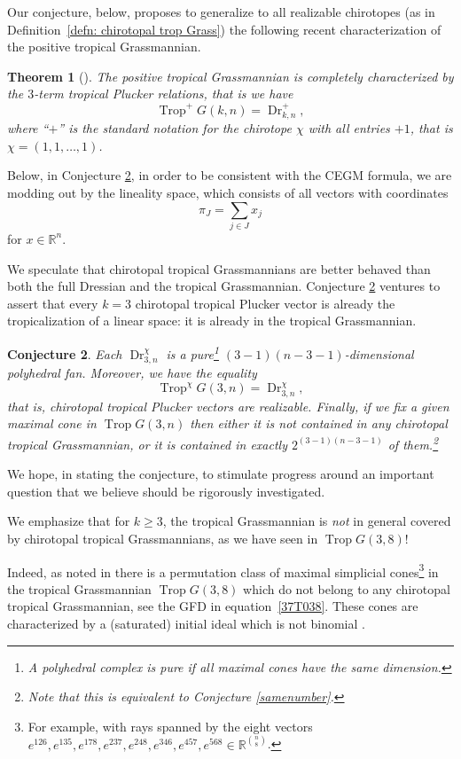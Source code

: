 \documentclass[pdftex]{sigma}
\newtheorem{thm}{Theorem}[section]
\newtheorem{conj}[thm]{Conjecture}
\theoremstyle{definition}
\numberwithin{equation}{section}
\begin{document}
Our conjecture, below, proposes to generalize to all realizable chirotopes (as in Definition~\ref{defn: chirotopal trop Grass}) the following recent characterization of the positive tropical Grassmannian.
\begin{thm}[\cite{Arkani-Hamed:2020cig,speyer2021positive}]
 The positive tropical Grassmannian is completely characterized by the $3$-term tropical Plucker relations, that is we have
 \[\operatorname{Trop}^+G(k,n) = \operatorname{Dr}^+_{k,n},\]
 where ``$+$'' is the standard notation for the chirotope $\chi$ with all entries $+1$, that is $\chi\! =\! (1,1,\dots ,1)$.
\end{thm}
Below, in Conjecture \ref{conj: chirotopal equality}, in order to be consistent with the CEGM formula, we are modding out  by the lineality space, which consists of all vectors with coordinates
\[\pi_J = \sum_{j\in J} x_j\]
for $x\in \mathbb{R}^n$.

We speculate that chirotopal tropical Grassmannians are better behaved than both the full Dressian and the tropical Grassmannian. Conjecture \ref{conj: chirotopal equality} ventures to assert that every $k=3$ chirotopal tropical Plucker vector is already the tropicalization of a linear space: it is already in the tropical Grassmannian.

\begin{conj}\label{conj: chirotopal equality}
 Each $\operatorname{Dr}^\chi_{3,n}$ is a pure\footnote{A polyhedral complex is pure if all maximal cones have the same dimension.} $(3-1)(n-3-1)$-dimensional polyhedral fan.
 Moreover, we have the equality
 \[\operatorname{Trop}^\chi G(3,n) = \operatorname{Dr}^\chi_{3,n},\]
 that is, chirotopal tropical Plucker vectors are realizable.
 Finally, if we fix a given maximal cone in $\operatorname{Trop} G(3,n)$ then either it is not contained in any chirotopal tropical Grassmannian, or it is contained in exactly $2^{(3-1)(n-3-1)}$ of them.\footnote{Note that this is equivalent to Conjecture \ref{samenumber}.}
\end{conj}
We hope, in stating the conjecture, to stimulate progress around an important question that we believe should be rigorously investigated.

We emphasize that for $k\ge3$, the tropical Grassmannian is \textit{not} in general covered by chirotopal tropical Grassmannians, as we have seen in $\operatorname{Trop}G(3,8)$!

Indeed, as noted in \cite{bendle2020parallel} there is a permutation class of maximal simplicial cones\footnote{For example, with rays spanned by the eight vectors $e^{126},e^{135},e^{178},e^{237},e^{248},e^{346},e^{457},e^{568} \in \mathbb{R}^{\binom{n}{8}}$.} in the tropical Grassmannian $\operatorname{Trop} G(3,8)$ which do not belong to any chirotopal tropical Grassmannian, see the GFD in equation~\eqref{37T038}. These cones are characterized by a (saturated) initial ideal which is not binomial \cite[Remark 4.5]{bendle2020parallel}.
\end{document}
